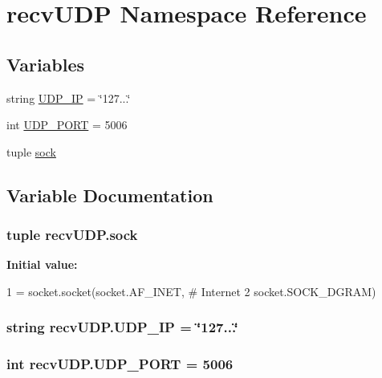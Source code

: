 \hypertarget{namespacerecvUDP}{}\section{recv\+U\+D\+P Namespace Reference}
\label{namespacerecvUDP}
\subsection*{Variables}
\begin{DoxyCompactItemize}
\item 
string \hyperlink{namespacerecvUDP_a6b11c7dbdb53247d632e2d884c1b901a}{U\+D\+P\+\_\+\+I\+P} = \char`\"{}127...\char`\"{}
\item 
int \hyperlink{namespacerecvUDP_aa488e1f9b637ddf92b4d8b97fd3f6caa}{U\+D\+P\+\_\+\+P\+O\+R\+T} = 5006
\item 
tuple \hyperlink{namespacerecvUDP_a3a927e179ce4915f2b04381e2c821114}{sock}
\end{DoxyCompactItemize}


\subsection{Variable Documentation}
\hypertarget{namespacerecvUDP_a3a927e179ce4915f2b04381e2c821114}{}
\subsubsection[{sock}]{\setlength{\rightskip}{0pt plus 5cm}tuple recv\+U\+D\+P.\+sock}\label{namespacerecvUDP_a3a927e179ce4915f2b04381e2c821114}
{\bfseries Initial value\+:}
\begin{DoxyCode}
1 = socket.socket(socket.AF\_INET, \textcolor{comment}{# Internet}
2                      socket.SOCK\_DGRAM)
\end{DoxyCode}
\hypertarget{namespacerecvUDP_a6b11c7dbdb53247d632e2d884c1b901a}{}
\subsubsection[{U\+D\+P\+\_\+\+I\+P}]{\setlength{\rightskip}{0pt plus 5cm}string recv\+U\+D\+P.\+U\+D\+P\+\_\+\+I\+P = \char`\"{}127...\char`\"{}}\label{namespacerecvUDP_a6b11c7dbdb53247d632e2d884c1b901a}
\hypertarget{namespacerecvUDP_aa488e1f9b637ddf92b4d8b97fd3f6caa}{}
\subsubsection[{U\+D\+P\+\_\+\+P\+O\+R\+T}]{\setlength{\rightskip}{0pt plus 5cm}int recv\+U\+D\+P.\+U\+D\+P\+\_\+\+P\+O\+R\+T = 5006}\label{namespacerecvUDP_aa488e1f9b637ddf92b4d8b97fd3f6caa}
